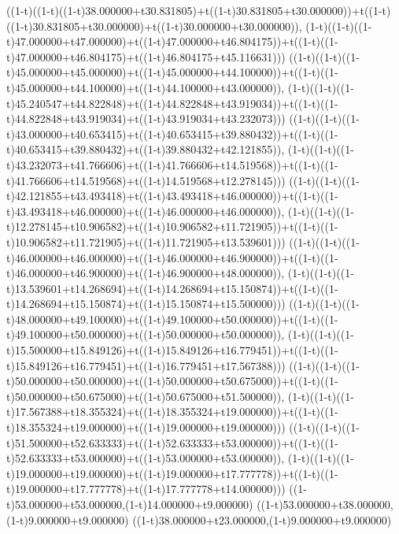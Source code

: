 ((1-t)((1-t)((1-t)38.000000+t30.831805)+t((1-t)30.831805+t30.000000))+t((1-t)((1-t)30.831805+t30.000000)+t((1-t)30.000000+t30.000000)),                                     (1-t)((1-t)((1-t)47.000000+t47.000000)+t((1-t)47.000000+t46.804175))+t((1-t)((1-t)47.000000+t46.804175)+t((1-t)46.804175+t45.116631)))
((1-t)((1-t)((1-t)45.000000+t45.000000)+t((1-t)45.000000+t44.100000))+t((1-t)((1-t)45.000000+t44.100000)+t((1-t)44.100000+t43.000000)),                                     (1-t)((1-t)((1-t)45.240547+t44.822848)+t((1-t)44.822848+t43.919034))+t((1-t)((1-t)44.822848+t43.919034)+t((1-t)43.919034+t43.232073)))
((1-t)((1-t)((1-t)43.000000+t40.653415)+t((1-t)40.653415+t39.880432))+t((1-t)((1-t)40.653415+t39.880432)+t((1-t)39.880432+t42.121855)),                                     (1-t)((1-t)((1-t)43.232073+t41.766606)+t((1-t)41.766606+t14.519568))+t((1-t)((1-t)41.766606+t14.519568)+t((1-t)14.519568+t12.278145)))
((1-t)((1-t)((1-t)42.121855+t43.493418)+t((1-t)43.493418+t46.000000))+t((1-t)((1-t)43.493418+t46.000000)+t((1-t)46.000000+t46.000000)),                                     (1-t)((1-t)((1-t)12.278145+t10.906582)+t((1-t)10.906582+t11.721905))+t((1-t)((1-t)10.906582+t11.721905)+t((1-t)11.721905+t13.539601)))
((1-t)((1-t)((1-t)46.000000+t46.000000)+t((1-t)46.000000+t46.900000))+t((1-t)((1-t)46.000000+t46.900000)+t((1-t)46.900000+t48.000000)),                                     (1-t)((1-t)((1-t)13.539601+t14.268694)+t((1-t)14.268694+t15.150874))+t((1-t)((1-t)14.268694+t15.150874)+t((1-t)15.150874+t15.500000)))
((1-t)((1-t)((1-t)48.000000+t49.100000)+t((1-t)49.100000+t50.000000))+t((1-t)((1-t)49.100000+t50.000000)+t((1-t)50.000000+t50.000000)),                                     (1-t)((1-t)((1-t)15.500000+t15.849126)+t((1-t)15.849126+t16.779451))+t((1-t)((1-t)15.849126+t16.779451)+t((1-t)16.779451+t17.567388)))
((1-t)((1-t)((1-t)50.000000+t50.000000)+t((1-t)50.000000+t50.675000))+t((1-t)((1-t)50.000000+t50.675000)+t((1-t)50.675000+t51.500000)),                                     (1-t)((1-t)((1-t)17.567388+t18.355324)+t((1-t)18.355324+t19.000000))+t((1-t)((1-t)18.355324+t19.000000)+t((1-t)19.000000+t19.000000)))
((1-t)((1-t)((1-t)51.500000+t52.633333)+t((1-t)52.633333+t53.000000))+t((1-t)((1-t)52.633333+t53.000000)+t((1-t)53.000000+t53.000000)),                                     (1-t)((1-t)((1-t)19.000000+t19.000000)+t((1-t)19.000000+t17.777778))+t((1-t)((1-t)19.000000+t17.777778)+t((1-t)17.777778+t14.000000)))
((1-t)53.000000+t53.000000,(1-t)14.000000+t9.000000)
((1-t)53.000000+t38.000000,(1-t)9.000000+t9.000000)
((1-t)38.000000+t23.000000,(1-t)9.000000+t9.000000)
